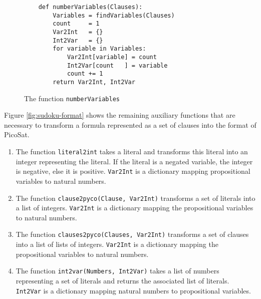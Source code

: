 \begin{figure}[!ht]
\centering
\begin{verbatim}
    def numberVariables(Clauses):
        Variables = findVariables(Clauses)
        count     = 1
        Var2Int   = {}
        Int2Var   = {}
        for variable in Variables:
            Var2Int[variable] = count
            Int2Var[count   ] = variable
            count += 1
        return Var2Int, Int2Var             
\end{verbatim}
\vspace*{-0.3cm}
\caption{The function \texttt{numberVariables}}
\label{fig:sudoku-numberVariables}
\end{figure}

\pagebreak
Figure \ref{fig:sudoku-format} shows the remaining auxiliary functions that are necessary to transform a
formula represented as a set of clauses into the format of PicoSat.
\begin{enumerate}
\item The function \texttt{literal2int} takes a literal and transforms this literal into an integer
      representing the literal. If the literal is a negated variable, the integer is negative, else it is
      positive. \texttt{Var2Int} is a dictionary mapping propositional variables to natural numbers.
\item The function \texttt{clause2pyco(Clause, Var2Int)} transforms a set of literals into a list of integers.
      \texttt{Var2Int} is a dictionary mapping the propositional variables to natural numbers. 
\item The function \texttt{clauses2pyco(Clauses, Var2Int)} transforms a set of clauses into a list of lists of
      integers. \texttt{Var2Int} is a dictionary mapping the propositional variables to natural numbers.  
\item The function \texttt{int2var(Numbers, Int2Var)} takes a list of numbers representing a set of literals and returns
      the associated list of literals.  \texttt{Int2Var} is a dictionary mapping natural numbers to
      propositional variables.     
\end{enumerate}

